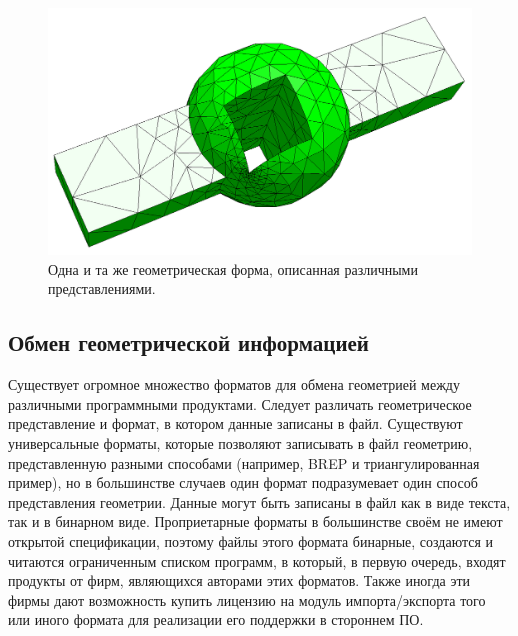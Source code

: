 \begin{figure}[H]
\hspace{0.01\textwidth}
\begin{minipage}[b]{0.495\textwidth}
\includegraphics[width=1.0\textwidth]{pictures/FEM_rough.png}
\end{minipage}
\caption{Одна и та же геометрическая форма, описанная различными представлениями.}
\label{fig:DiffGeoRepr}
\end{figure}

%                                                              

\subsection{Обмен геометрической информацией}\label{sec:secGeoFormats}

Существует огромное множество форматов для обмена геометрией между различными программными продуктами. Следует различать геометрическое представление и формат, в котором данные записаны в файл. Существуют универсальные форматы, которые позволяют записывать в файл геометрию, представленную разными способами (например, BREP и триангулированная \todo пример), но в большинстве случаев один формат подразумевает один способ представления геометрии. Данные могут быть записаны в файл как в виде текста, так и в бинарном виде. Проприетарные форматы в большинстве своём не имеют открытой спецификации, поэтому файлы этого формата бинарные, создаются и читаются ограниченным списком программ, в который, в первую очередь, входят продукты от фирм, являющихся авторами этих форматов. Также иногда эти фирмы дают возможность купить лицензию на модуль импорта/экспорта того или иного формата для реализации его поддержки в стороннем ПО.

